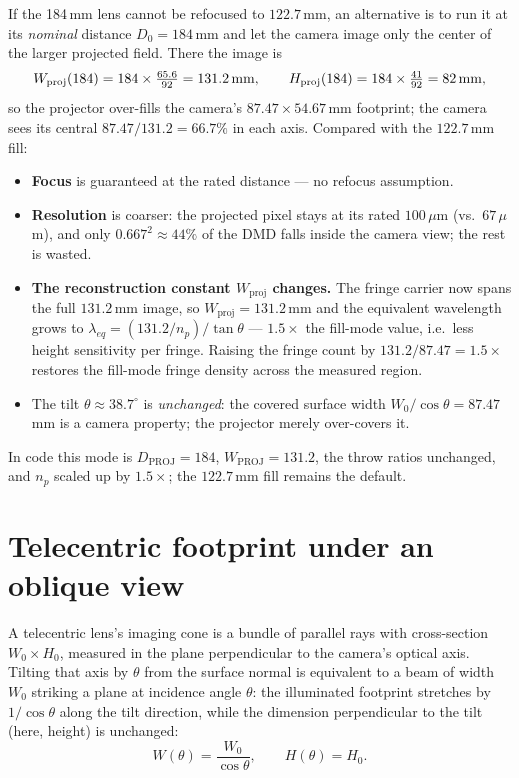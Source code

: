 \documentclass[11pt]{article}
\begin{document}
If the 184\,mm lens cannot be refocused to $122.7$\,mm, an alternative is to
run it at its \emph{nominal} distance $D_0 = 184$\,mm and let the camera image
only the center of the larger projected field. There the image is
\begin{equation}
  W_{\text{proj}}(184) = 184 \times \tfrac{65.6}{92} = 131.2\text{\,mm}, \qquad
  H_{\text{proj}}(184) = 184 \times \tfrac{41}{92} = 82\text{\,mm},
\end{equation}
so the projector over-fills the camera's $87.47\times54.67$\,mm footprint; the
camera sees its central $87.47/131.2 = 66.7\%$ in each axis. Compared with the
$122.7$\,mm fill:
\begin{itemize}
  \item \textbf{Focus} is guaranteed at the rated distance --- no refocus
        assumption.
  \item \textbf{Resolution} is coarser: the projected pixel stays at its rated
        $100\,\mu$m (vs.\ $67\,\mu$m), and only $0.667^2 \approx 44\%$ of the
        DMD falls inside the camera view; the rest is wasted.
  \item \textbf{The reconstruction constant $W_{\text{proj}}$ changes.} The
        fringe carrier now spans the full $131.2$\,mm image, so
        $W_{\text{proj}} = 131.2$\,mm and the equivalent wavelength grows to
        $\lambda_{eq} = (131.2/n_p)/\tan\theta$ --- $1.5\times$ the fill-mode
        value, i.e.\ less height sensitivity per fringe. Raising the fringe
        count by $131.2/87.47 = 1.5\times$ restores the fill-mode fringe
        density across the measured region.
  \item The tilt $\theta \approx 38.7^\circ$ is \emph{unchanged}: the covered
        surface width $W_0/\cos\theta = 87.47$\,mm is a camera property; the
        projector merely over-covers it.
\end{itemize}
In code this mode is $D_{\text{PROJ}} = 184$, $W_{\text{PROJ}} = 131.2$, the
throw ratios unchanged, and $n_p$ scaled up by $1.5\times$; the $122.7$\,mm
fill remains the default.

\section{Telecentric footprint under an oblique view}

A telecentric lens's imaging cone is a bundle of parallel rays with
cross-section $W_0 \times H_0$, measured in the plane perpendicular to the
camera's optical axis. Tilting that axis by $\theta$ from the surface
normal is equivalent to a beam of width $W_0$ striking a plane at
incidence angle $\theta$: the illuminated footprint stretches by
$1/\cos\theta$ along the tilt direction, while the dimension
perpendicular to the tilt (here, height) is unchanged:
\begin{equation}
  W(\theta) = \frac{W_0}{\cos\theta}, \qquad H(\theta) = H_0.
\end{equation}
\end{document}
